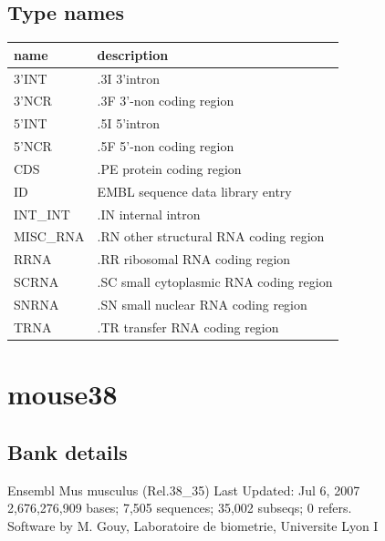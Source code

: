 \documentclass{article}
\begin{document}
\begin{Schunk}
\subsection{Type names}
\noindent\begin{tabular}{ll}
\hline \hline
name & description\\
\hline
3'INT & .3I 3'intron \\
3'NCR & .3F  3'-non coding region \\
5'INT & .5I 5'intron \\
5'NCR & .5F  5'-non coding region \\
CDS & .PE protein coding region \\
ID & EMBL sequence data library entry \\
INT\_INT & .IN  internal intron \\
MISC\_RNA & .RN other structural RNA coding region \\
RRNA & .RR ribosomal RNA coding region \\
SCRNA & .SC small cytoplasmic RNA coding region \\
SNRNA & .SN small nuclear RNA coding region \\
TRNA & .TR transfer RNA coding region \\
\hline \hline
\end{tabular}

\section{ mouse38 }
\subsection{Bank details}
Ensembl Mus musculus (Rel.38\_35) Last Updated: Jul  6, 2007\\
2,676,276,909 bases; 7,505 sequences; 35,002 subseqs; 0 refers.\\
Software by M. Gouy, Laboratoire de biometrie, Universite Lyon I


\end{Schunk}
\end{document}
